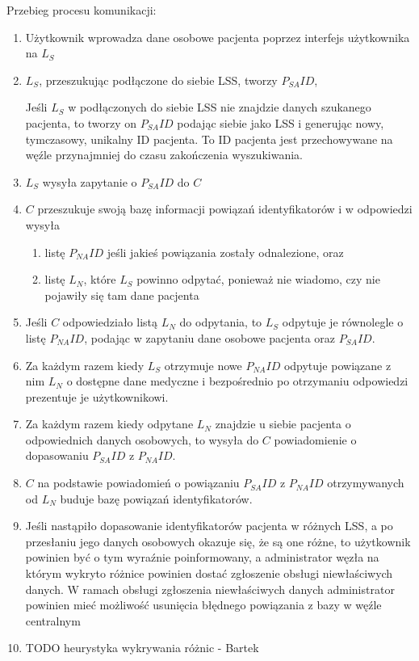 \documentclass[a4paper]{report}
\begin{document}
Przebieg procesu komunikacji:
\begin{enumerate}
  \item Użytkownik wprowadza dane osobowe pacjenta poprzez interfejs użytkownika na $L_S$
  \item $L_S$, przeszukując podłączone do siebie LSS, tworzy $P_{SA}ID$,

  Jeśli $L_S$ w podłączonych do siebie LSS nie znajdzie danych szukanego pacjenta, to tworzy on $P_{SA}ID$ podając siebie jako LSS i generując nowy, tymczasowy, unikalny ID pacjenta. To ID pacjenta jest przechowywane na węźle przynajmniej do czasu zakończenia wyszukiwania.
  
  \item $L_S$ wysyła zapytanie o $P_{SA}ID$ do $C$
  \item $C$ przeszukuje swoją bazę informacji powiązań identyfikatorów i w odpowiedzi wysyła
    \begin{enumerate}
      \item listę $P_{NA}ID$ jeśli jakieś powiązania zostały odnalezione, oraz
      \item listę $L_N$, które $L_S$ powinno odpytać, ponieważ nie wiadomo, czy nie pojawiły się tam dane pacjenta
    \end{enumerate}
  \item Jeśli $C$ odpowiedziało listą $L_N$ do odpytania, to $L_S$ odpytuje je równolegle o listę $P_{NA}ID$,
  podając w zapytaniu dane osobowe pacjenta oraz $P_{SA}ID$.
  \item Za każdym razem kiedy $L_S$ otrzymuje nowe $P_{NA}ID$ odpytuje powiązane z nim $L_N$ o dostępne dane medyczne i bezpośrednio
  po otrzymaniu odpowiedzi prezentuje je użytkownikowi.
  \item Za każdym razem kiedy odpytane $L_N$ znajdzie u siebie pacjenta o odpowiednich danych osobowych, to wysyła do $C$ powiadomienie
  o dopasowaniu $P_{SA}ID$ z $P_{NA}ID$.
  \item $C$ na podstawie powiadomień o powiązaniu $P_{SA}ID$ z $P_{NA}ID$ otrzymywanych od $L_N$ buduje bazę powiązań identyfikatorów.
  \item Jeśli nastąpiło dopasowanie identyfikatorów pacjenta w różnych LSS, a po przesłaniu jego danych osobowych okazuje się, że są one różne, to użytkownik powinien być o tym wyraźnie poinformowany, a administrator węzła na którym wykryto różnice powinien dostać zgłoszenie obsługi niewłaściwych danych. W ramach obsługi zgłoszenia niewłaściwych danych administrator powinien mieć możliwość usunięcia błędnego powiązania z bazy w węźle centralnym
  \item TODO heurystyka wykrywania różnic - Bartek

\end{enumerate}
\end{document}
